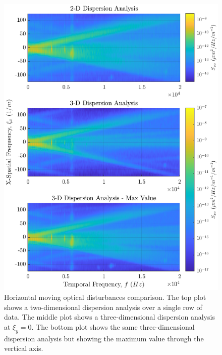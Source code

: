 \begin{figure}
  \centering
  \includegraphics{../matlab/04_dispersion_analysis/dispersion_comparison.eps}
  \caption{Horizontal moving optical disturbances comparison. The top plot shows a two-dimensional dispersion analysis over a single row of data. The middle plot shows a three-dimensional dispersion analysis at $\xi_y=0$. The bottom plot shows the same three-dimensional dispersion analysis but showing the maximum value through the vertical axis.}
  \label{fig:04_dispersion_comparison}
\end{figure}




